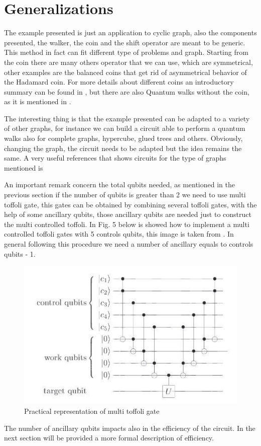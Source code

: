 \section{Generalizations}

The example presented is just an application to cyclic graph, also the components presented, the walker, 
the coin and the shift operator are meant to be generic. This method in fact can fit different type of problems and graph.
Starting from the coin there are many others operator that we can use, which are symmetrical, other examples are the 
balanced coins that get rid of asymmetrical behavior of the Hadamard coin. For more details
about different coins an introductory summary can be found in \cite{Kempe_2003}, but there are also Quantum walks without
the coin, as it is mentioned in \cite{6812670}.


The interesting thing is that the example presented can be adapted to a variety of other graphs, for instance we can
build a circuit able to perform a quantum walks also for complete graphs, hypercube, glued trees and others. 
Obviously, changing the graph, the circuit needs to be adapted but the idea remains the same. A very useful
references that shows circuits for the type of graphs mentioned is \cite{douglas2007efficient}


An important remark concern the total qubits needed, as mentioned in the previous section if
the number of qubits is greater than 2 we need to use multi toffoli gate, this gates can be 
obtained by combining several toffoli gates, with the help of some ancillary qubits, those 
ancillary qubits are needed just to construct the multi controlled toffoli. In Fig. 5 below
is showed how to implement a multi controlled toffoli gates with 5 controls qubits, 
this image is taken from \cite{nielsen_chuang_2010}. In general following this procedure
we need a number of ancillary equals to controls qubits - 1.

\begin{figure}[h!]
    \includegraphics[scale=0.5]{img/ancillary.jpg}
    \caption{Practical representation of multi toffoli gate}
    \centering
\end{figure}

The number of ancillary qubits impacts also in the efficiency of the circuit. In the next
section will be provided a more formal description of efficiency.
